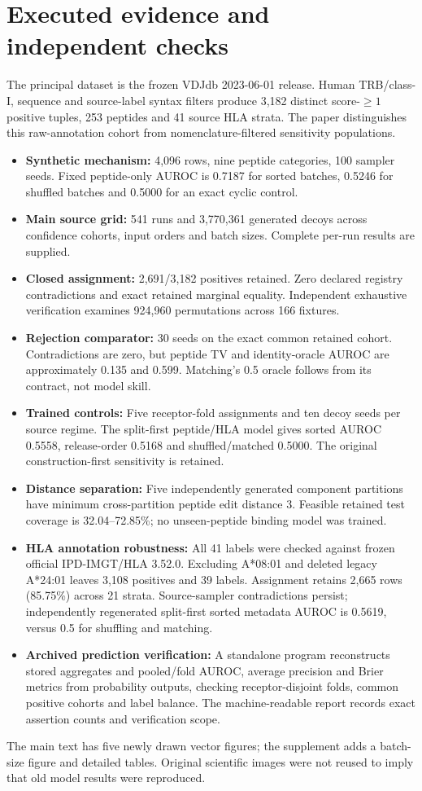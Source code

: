 \documentclass[11pt,a4paper]{article}
\begin{document}
\section{Executed evidence and independent checks}
The principal dataset is the frozen VDJdb 2023-06-01 release. Human TRB/class-I, sequence and source-label syntax filters produce 3,182 distinct score-$\geq1$ positive tuples, 253 peptides and 41 source HLA strata. The paper distinguishes this raw-annotation cohort from nomenclature-filtered sensitivity populations.

\begin{itemize}
\item \textbf{Synthetic mechanism:} 4,096 rows, nine peptide categories, 100 sampler seeds. Fixed peptide-only AUROC is 0.7187 for sorted batches, 0.5246 for shuffled batches and 0.5000 for an exact cyclic control.
\item \textbf{Main source grid:} 541 runs and 3,770,361 generated decoys across confidence cohorts, input orders and batch sizes. Complete per-run results are supplied.
\item \textbf{Closed assignment:} 2,691/3,182 positives retained. Zero declared registry contradictions and exact retained marginal equality. Independent exhaustive verification examines 924,960 permutations across 166 fixtures.
\item \textbf{Rejection comparator:} 30 seeds on the exact common retained cohort. Contradictions are zero, but peptide TV and identity-oracle AUROC are approximately 0.135 and 0.599. Matching's 0.5 oracle follows from its contract, not model skill.
\item \textbf{Trained controls:} Five receptor-fold assignments and ten decoy seeds per source regime. The split-first peptide/HLA model gives sorted AUROC 0.5558, release-order 0.5168 and shuffled/matched 0.5000. The original construction-first sensitivity is retained.
\item \textbf{Distance separation:} Five independently generated component partitions have minimum cross-partition peptide edit distance 3. Feasible retained test coverage is 32.04--72.85\%; no unseen-peptide binding model was trained.
\item \textbf{HLA annotation robustness:} All 41 labels were checked against frozen official IPD-IMGT/HLA 3.52.0. Excluding A*08:01 and deleted legacy A*24:01 leaves 3,108 positives and 39 labels. Assignment retains 2,665 rows (85.75\%) across 21 strata. Source-sampler contradictions persist; independently regenerated split-first sorted metadata AUROC is 0.5619, versus 0.5 for shuffling and matching.
\item \textbf{Archived prediction verification:} A standalone program reconstructs stored aggregates and pooled/fold AUROC, average precision and Brier metrics from probability outputs, checking receptor-disjoint folds, common positive cohorts and label balance. The machine-readable report records exact assertion counts and verification scope.
\end{itemize}
The main text has five newly drawn vector figures; the supplement adds a batch-size figure and detailed tables. Original scientific images were not reused to imply that old model results were reproduced.
\end{document}
